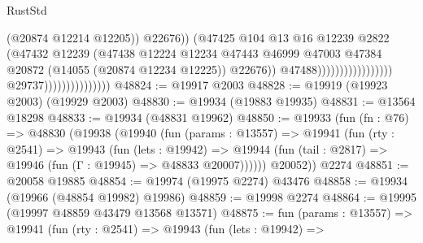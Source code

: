 \begin{lexlean}{RustStd}
\begin{coremodule}
                                                                        (@20874 @12214 @12205))
                                                                      @22676))
                                                                  (@47425
                                                                    @104
                                                                    @13
                                                                    @16
                                                                    @12239
                                                                    @2822
                                                                    (@47432
                                                                      @12239
                                                                      (@47438
                                                                        @12224
                                                                        @12234
                                                                        @47443
                                                                        @46999
                                                                        @47003
                                                                        @47384
                                                                        @20872
                                                                        (@14055
                                                                          (@20874 @12234 @12225))
                                                                        @22676))
                                                                    @47488)))))))))))))))))
                                  @29737)))))))))))))))
@48824 := @19917 @2003
@48828 := @19919 (@19923 @2003) (@19929 @2003)
@48830 := @19934 (@19883 @19935)
@48831 := @13564 @18298
@48833 := @19934 (@48831 @19962)
@48850 := @19933
    (fun (fn : @76) =>
    @48830
      (@19938
        (@19940
          (fun (params : @13557) =>
          @19941
            (fun (rty : @2541) =>
            @19943
              (fun (lets : @19942) =>
              @19944 (fun (tail : @2817) => @19946 (fun (Γ : @19945) => @48833 @20007))))))
        @20052))
    @2274
@48851 := @20058 @19885
@48854 := @19974 (@19975 @2274) @43476
@48858 := @19934 (@19966 (@48854 @19982) @19986)
@48859 := @19998 @2274
@48864 := @19995 (@19997 @48859 @43479 @13568 @13571)
@48875 := fun (params : @13557) =>
  @19941
    (fun (rty : @2541) =>
    @19943
      (fun (lets : @19942) =>

\end{coremodule}
\end{lexlean}
